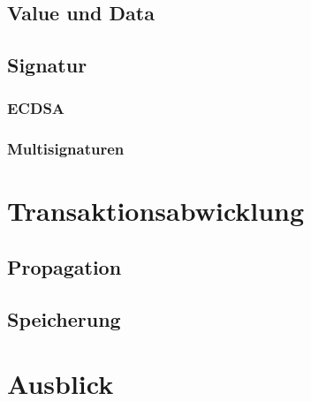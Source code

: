 \documentclass[runningheads]{llncs}
\begin{document}
\subsection{Value und Data}

\subsection{Signatur}

\subsubsection{ECDSA}
\label{ecdsa}

\subsubsection{Multisignaturen}

\section{Transaktionsabwicklung}

\subsection{Propagation}

\subsection{Speicherung}

\section{Ausblick}



\end{document}
